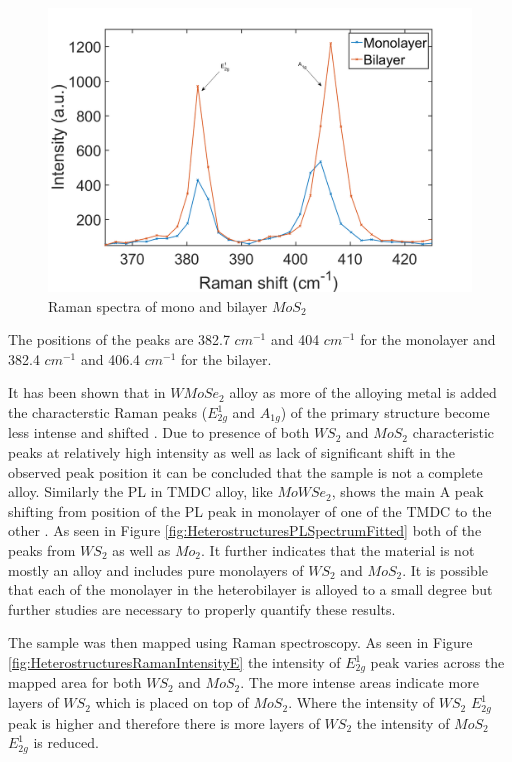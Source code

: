 \begin{figure}[H]
	\begin{center}
		\includegraphics[scale=0.3]{Heterostructures/RamanSpectraMonoBi2.png}
		\caption{Raman spectra of mono and bilayer $MoS_2$}
		\label{fig:HeterostructuresRamanSpectraMonoBi}
	\end{center}
\end{figure}

The positions of the peaks are 382.7 $cm^{-1}$ and 404 $cm^{-1}$ for the monolayer and 382.4 $cm^{-1}$ and 406.4 $cm^{-1}$ for the bilayer. 

It has been shown that in $WMoSe_2$ alloy as more of the alloying metal is added the characterstic Raman peaks ($E^1_{2g}$ and $A_{1g}$) of the primary structure become less intense and shifted \cite{Zhang2014}. Due to presence of both $WS_2$ and $MoS_2$ characteristic peaks at relatively high intensity as well as lack of significant shift in the observed peak position it can be concluded that the sample is not a complete alloy. Similarly the PL in TMDC alloy, like $MoWSe_2$, shows the main A peak shifting from position of the PL peak in monolayer of one of the TMDC to the other \cite{Wang2015}. As seen in Figure \ref{fig:HeterostructuresPLSpectrumFitted} both of the peaks from $WS_2$ as well as $Mo_2$. It further indicates that the material is not mostly an alloy and includes pure monolayers of $WS_2$ and $MoS_2$. It is possible that each of the monolayer in the heterobilayer is alloyed to a small degree but further studies are necessary to properly quantify these results.

The sample was then mapped using Raman spectroscopy. As seen in Figure \ref{fig:HeterostructuresRamanIntensityE} the intensity of $E^1_{2g}$ peak varies across the mapped area for both $WS_2$ and $MoS_2$. The more intense areas indicate more layers of $WS_2$ which is placed on top of $MoS_2$. Where the intensity of $WS_2$ $E^1_{2g}$ peak is higher and therefore there is more layers of $WS_2$ the intensity of $MoS_2$ $E^1_{2g}$ is reduced. 


